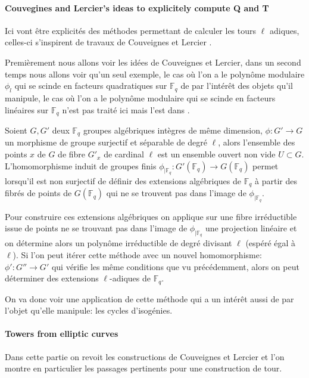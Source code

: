 \documentclass[10pt,a4paper]{book}
\theoremstyle{plain}
\theoremstyle{definition}
\theoremstyle{definition}
\theoremstyle{definition}
\theoremstyle{definition}
\theoremstyle{remark}
\theoremstyle{remark}
\begin{document}
\paragraph{Couvegines and Lercier's ideas to explicitely compute Q and T}
Ici vont être explicités des méthodes permettant de calculer les tours $\ell$ adiques, celles-ci s'inspirent de travaux de Couveignes et Lercier \cite{couveignesLercier2013}.

Premièrement nous allons voir les idées de Couveignes et Lercier, dans un second temps nous allons voir qu'un seul exemple, le cas où l'on a le polynôme modulaire $\phi_l$ qui se scinde en facteurs quadratiques sur $\mathbb{F}_q$ de par l'intérêt des objets qu'il manipule, le cas où l'on a le polynôme modulaire qui se scinde en facteurs linéaires sur $\mathbb{F}_q$ n'est pas traité ici mais l'est dans \cite{DeFeo-Doliskani-Schost13}.

Soient $G,G'$ deux $\mathbb{F}_q$ groupes algébriques intègres de même dimension, $\phi: G' \to G$ un morphisme de groupe surjectif et séparable de degré $\ell$, alors l'ensemble des points $x$ de $G$ de fibre $G'_x$ de cardinal $\ell$ est un ensemble ouvert non vide $U \subset G$. 
L'homomorphisme induit de groupes finis $\phi_{\mid \mathbb{F}_q}: G'(\mathbb{F}_q) \to G(\mathbb{F}_q)$ permet lorsqu'il est non surjectif de définir des extensions algébriques de $\mathbb{F}_q$ à partir des fibrés de points de $G(\mathbb{F}_q)$ qui ne se trouvent pas dans l'image de $\phi_{\mid \mathbb{F}_q}$. 

Pour construire ces extensions algébriques on applique sur une fibre irréductible issue de points ne se trouvant pas dans l'image de $\phi_{\mid \mathbb{F}_q}$ une projection linéaire et on détermine alors un polynôme irréductible de degré divisant $\ell$ (espéré égal à $\ell$). Si l'on peut itérer cette méthode avec un nouvel homomorphisme: $\phi':G'' \to G'$ qui vérifie les même conditions que vu précédemment, alors on peut déterminer des extensions $\ell$-adiques de $\mathbb{F}_q$.

On va donc voir une application de cette méthode qui a un intérêt aussi de par l'objet qu'elle manipule: les cycles d'isogénies.

\paragraph{Towers from elliptic curves}
Dans cette partie on revoit les constructions de Couveignes et Lercier \cite{couveignesLercier2013} et l'on montre en particulier les passages pertinents pour une construction de tour.
\end{document}
